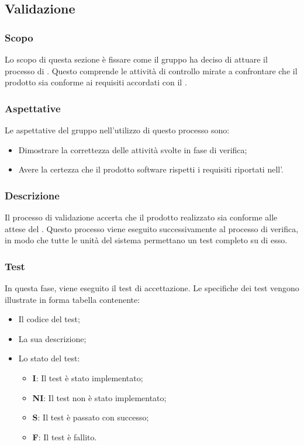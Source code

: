 \subsection{Validazione}
\subsubsection{Scopo}
Lo scopo di questa sezione è fissare come il gruppo ha deciso di attuare il processo di . Questo comprende le attività di controllo mirate a confrontare che il prodotto sia conforme ai requisiti accordati con il .

\subsubsection{Aspettative}
Le aspettative del gruppo \Gruppo{} nell'utilizzo di questo processo sono:
\begin{itemize}
	\item Dimostrare la correttezza delle attività svolte in fase di verifica; 
	\item Avere la certezza che il prodotto software rispetti i requisiti riportati nell'.
\end{itemize}

\subsubsection{Descrizione}
Il processo di validazione accerta che il prodotto realizzato sia conforme alle attese del . Questo processo viene eseguito successivamente al processo di verifica, in modo che tutte le unità del sistema permettano un test completo su di esso.

\subsubsection{Test}
In questa fase, viene eseguito il test di accettazione. Le specifiche dei test vengono illustrate in forma tabella contenente:
\begin{itemize}
	\item Il codice del test;
	\item La sua descrizione;
	\item Lo stato del test:
	\begin{itemize}
		\item \textbf{I}: Il test è stato implementato;
		\item \textbf{NI}: Il test non è stato implementato;
		\item \textbf{S}: Il test è passato con successo;
		\item \textbf{F}: Il test è fallito.
	\end{itemize}	 
\end{itemize}
